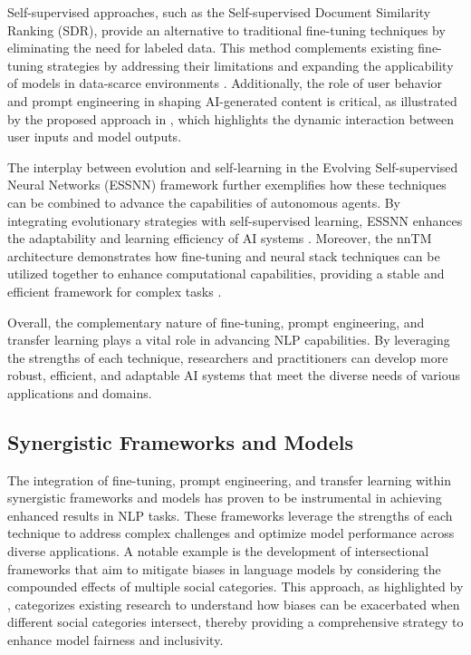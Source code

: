 Self-supervised approaches, such as the Self-supervised Document Similarity Ranking (SDR), provide an alternative to traditional fine-tuning techniques by eliminating the need for labeled data. This method complements existing fine-tuning strategies by addressing their limitations and expanding the applicability of models in data-scarce environments \cite{ginzburg2021selfsuperviseddocumentsimilarityranking}. Additionally, the role of user behavior and prompt engineering in shaping AI-generated content is critical, as illustrated by the proposed approach in \cite{palmini2024patternscreativityuserinput}, which highlights the dynamic interaction between user inputs and model outputs.

The interplay between evolution and self-learning in the Evolving Self-supervised Neural Networks (ESSNN) framework further exemplifies how these techniques can be combined to advance the capabilities of autonomous agents. By integrating evolutionary strategies with self-supervised learning, ESSNN enhances the adaptability and learning efficiency of AI systems \cite{le2019evolvingselfsupervisedneuralnetworks}. Moreover, the nnTM architecture demonstrates how fine-tuning and neural stack techniques can be utilized together to enhance computational capabilities, providing a stable and efficient framework for complex tasks \cite{stogin2022provablystableneuralnetwork}.

Overall, the complementary nature of fine-tuning, prompt engineering, and transfer learning plays a vital role in advancing NLP capabilities. By leveraging the strengths of each technique, researchers and practitioners can develop more robust, efficient, and adaptable AI systems that meet the diverse needs of various applications and domains.


\subsection{Synergistic Frameworks and Models} \label{subsec:Synergistic Frameworks and Models}



The integration of fine-tuning, prompt engineering, and transfer learning within synergistic frameworks and models has proven to be instrumental in achieving enhanced results in NLP tasks. These frameworks leverage the strengths of each technique to address complex challenges and optimize model performance across diverse applications. A notable example is the development of intersectional frameworks that aim to mitigate biases in language models by considering the compounded effects of multiple social categories. This approach, as highlighted by \cite{magee2021intersectionalbiascausallanguage}, categorizes existing research to understand how biases can be exacerbated when different social categories intersect, thereby providing a comprehensive strategy to enhance model fairness and inclusivity.



